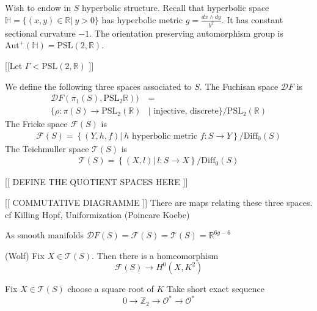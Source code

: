 Wish to endow in $S$ hyperbolic structure.
Recall that hyperbolic space $ \mathbb{H} = \{ (x,y) \in \mathbb{R}  |~ y> 0 \} $
has hyperbolic metric $ g = \frac{dx \wedge dy }{ y^2} $.
It has constant sectional curvature $-1$. 
The orientation preserving automorphism group is $ \mathrm{Aut}^+ ( \mathbb{H} ) = \mathrm{PSL}(2, \mathbb{R} ) $. 

[[Let $ \Gamma < \mathrm{PSL}(2, \mathbb{R}) $ ]]


We define the following three spaces associated to $S$.
The Fuchisan space $ \mathcal{D}F$ is 
\begin{align}
    \mathcal{D} F ( \pi_1 ( S) , \mathrm{PSL}_2 \mathbb{R} ) ) & = \\
    \{ \rho : \pi ( S)  \rightarrow  \mathrm{PSL}_2( \mathbb{R} ) & | \mbox{ injective, discrete} \} /\mathrm{PSL}_2 (\mathbb{R} ) 
\end{align}
The Fricke space $\mathcal{F}(S)$ is
\begin{align}
    \mathcal{F} ( S)  = \left\{ ( Y, h, f) |~ h \mbox{ hyperbolic metric } f:S \rightarrow Y \right\} / \mathrm{Diff}_0 ( S)  
\end{align}
The Teichmuller space $\mathcal{T}(S)$ is
\begin{align}
    \mathcal{T}(S)  = \left\{ ( X, l ) |~ l: S \rightarrow X  \right \}  / \mathrm{Diff}_0 ( S)  
\end{align}

[[ DEFINE THE QUOTIENT SPACES HERE ]] 

[[ COMMUTATIVE DIAGRAMME ]] 
There are maps relating these three spaces. 
cf Killing Hopf, Uniformization (Poincare Koebe) 



\begin{theorem}
As smooth manifolds $ \mathcal{D} F (S) = \mathcal{F} (S) = \mathcal{T} (S) = \mathbb{R}  ^{ 6g-6} $
\end{theorem}

\begin{theorem}
 (Wolf) 
    Fix $ X \in \mathcal{T} (S) $. 
    Then there is a homeomorphism 
    \begin{equation}
        \mathcal{F} (S) \rightarrow H^0 (X, K^2) 
    \end{equation}
\end{theorem}

Fix $ X \in \mathcal{T} ( S) $ choose a square root of $ K$ 
Take short exact sequence
\begin{equation}
    0 \rightarrow  \mathbb{Z} _2 \rightarrow \mathcal{O}^* \rightarrow \mathcal{O}^* 
\end{equation}

